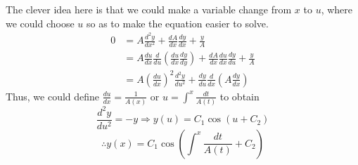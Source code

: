 \item

The clever idea here is that we could make a variable change from $x$ to $u$,
where we could choose $u$ so as to make the equation easier to solve.
\begin{align*}
	0
	&= A \frac{d^2 y}{dx^2} + \frac{dA}{dx} \frac{dy}{dx} + \frac{y}{A} \\
	&= A \frac{du}{dx} \frac{d}{du} \left( \frac{du}{dx} \frac{dy}{dy} \right)
	   + \frac{dA}{dx} \frac{du}{dx} \frac{dy}{du} + \frac{y}{A} \\
	&= A {\left( \frac{du}{dx} \right)}^2 \frac{d^2 y}{du^2}
	   + \frac{dy}{du} \frac{d}{dx} \left( A \frac{dy}{dx} \right)
\end{align*}
Thus, we could define $\frac{du}{dx} = \frac{1}{A(x)}$ or $u = \int^x \frac{dt}{A(t)}$ to obtain
\[
	\frac{d^2 y}{du^2} = -y
	\Rightarrow y(u) = C_1 \cos \left( u + C_2 \right)
\]
\[
	\therefore y(x) = C_1 \cos \left( \int^x \frac{dt}{A(t)} + C_2 \right)
\]